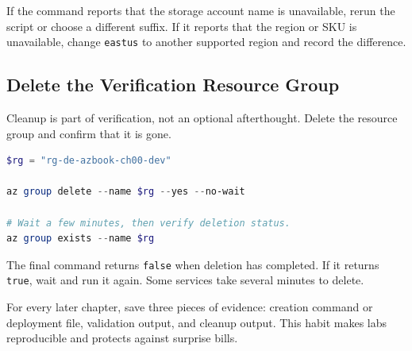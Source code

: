 If the command reports that the storage account name is unavailable, rerun the script or choose a different suffix. If it reports that the region or SKU is unavailable, change \texttt{eastus} to another supported region and record the difference.

\subsection{Delete the Verification Resource Group}
Cleanup is part of verification, not an optional afterthought. Delete the resource group and confirm that it is gone.

\begin{lstlisting}[language=PowerShell,caption={Deleting the temporary verification resource group.},label={lst:delete-verify-resources}]
$rg = "rg-de-azbook-ch00-dev"

az group delete --name $rg --yes --no-wait

# Wait a few minutes, then verify deletion status.
az group exists --name $rg
\end{lstlisting}

The final command returns \texttt{false} when deletion has completed. If it returns \texttt{true}, wait and run it again. Some services take several minutes to delete.

\begin{tipbox}
For every later chapter, save three pieces of evidence: creation command or deployment file, validation output, and cleanup output. This habit makes labs reproducible and protects against surprise bills.
\end{tipbox}

